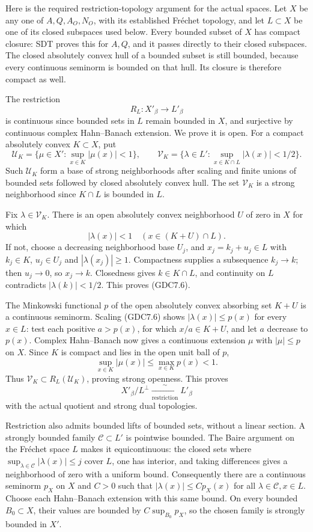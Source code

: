 Here is the required restriction-topology argument for the actual
spaces. Let \(X\) be any one of \(A,Q,A_O,N_O\), with its established
Fréchet topology, and let \(L\subset X\) be one of its closed subspaces
used below. Every bounded subset of \(X\) has compact closure: SDT
proves this for \(A,Q\), and it passes directly to their closed
subspaces. The closed absolutely convex hull of a bounded subset is
still bounded, because every continuous seminorm is bounded on that
hull. Its closure is therefore compact as well.

The restriction \[
R_L:X'_\beta\longrightarrow L'_\beta
\tag{GDC7.5}
\] is continuous since bounded sets in \(L\) remain bounded in \(X\),
and surjective by continuous complex Hahn--Banach extension. We prove it
is open. For a compact absolutely convex \(K\subset X\), put \[
\mathcal U_K=\{\mu\in X':\sup_{x\in K}|\mu(x)|<1\},\qquad
\mathcal V_K=\{\lambda\in L':\sup_{x\in K\cap L}|\lambda(x)|<1/2\}.
\] Such \(\mathcal U_K\) form a base of strong neighborhoods after
scaling and finite unions of bounded sets followed by closed absolutely
convex hull. The set \(\mathcal V_K\) is a strong neighborhood since
\(K\cap L\) is bounded in \(L\).

Fix \(\lambda\in\mathcal V_K\). There is an open absolutely convex
neighborhood \(U\) of zero in \(X\) for which \[
|\lambda(x)|<1\quad(x\in (K+U)\cap L).
\tag{GDC7.6}
\] If not, choose a decreasing neighborhood base \(U_j\), and
\(x_j=k_j+u_j\in L\) with \(k_j\in K\), \(u_j\in U_j\) and
\(|\lambda(x_j)|\ge1\). Compactness supplies a subsequence \(k_j\to k\);
then \(u_j\to0\), so \(x_j\to k\). Closedness gives \(k\in K\cap L\),
and continuity on \(L\) contradicts \(|\lambda(k)|<1/2\). This proves
(GDC7.6).

The Minkowski functional \(p\) of the open absolutely convex absorbing
set \(K+U\) is a continuous seminorm. Scaling (GDC7.6) shows
\(|\lambda(x)|\le p(x)\) for every \(x\in L\): test each positive
\(a>p(x)\), for which \(x/a\in K+U\), and let \(a\) decrease to
\(p(x)\). Complex Hahn--Banach now gives a continuous extension \(\mu\)
with \(|\mu|\le p\) on \(X\). Since \(K\) is compact and lies in the
open unit ball of \(p\), \[
\sup_{x\in K}|\mu(x)|\le\max_{x\in K}p(x)<1.
\] Thus \(\mathcal V_K\subset R_L(\mathcal U_K)\), proving strong
openness. This proves \[
X'_\beta/L^\perp\xrightarrow[\mathrm{restriction}]{\ \sim\ }L'_\beta
\tag{GDC7.7}
\] with the actual quotient and strong dual topologies.

Restriction also admits bounded lifts of bounded sets, without a linear
section. A strongly bounded family \(\mathcal C\subset L'\) is pointwise
bounded. The Baire argument on the Fréchet space \(L\) makes it
equicontinuous: the closed sets where
\(\sup_{\lambda\in\mathcal C}|\lambda(x)|\le j\) cover \(L\), one has
interior, and taking differences gives a neighborhood of zero with a
uniform bound. Consequently there are a continuous seminorm \(p_X\) on
\(X\) and \(C>0\) such that \(|\lambda(x)|\le C p_X(x)\) for all
\(\lambda\in\mathcal C,x\in L\). Choose each Hahn--Banach extension with
this same bound. On every bounded \(B_0\subset X\), their values are
bounded by \(C\sup_{B_0}p_X\), so the chosen family is strongly bounded
in \(X'\).


